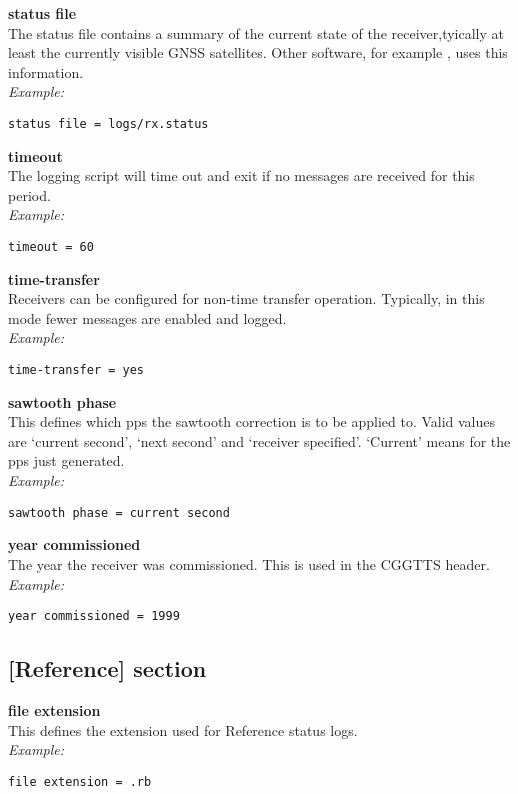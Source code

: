 {\bfseries status file}\\
The status file contains a summary of the current state of the receiver,tyically at least the
currently visible GNSS satellites. Other software, for example , uses this information.\\
\textit{Example:}
\begin{lstlisting}
status file = logs/rx.status
\end{lstlisting}

{\bfseries timeout}\\
The logging script will time out and exit if no messages are received for this period.\\
\textit{Example:}
\begin{lstlisting}
timeout = 60
\end{lstlisting}

{\bfseries time-transfer}\\
Receivers can be configured for non-time transfer operation. Typically, in this mode fewer
messages are enabled and logged.\\
\textit{Example:}
\begin{lstlisting}
time-transfer = yes
\end{lstlisting}

{\bfseries sawtooth phase}\\
This defines which pps the sawtooth correction is to be applied to.
Valid values are `current second', `next second' and `receiver specified'.
`Current' means for the pps just generated.\\
\textit{Example:}
\begin{lstlisting}
sawtooth phase = current second
\end{lstlisting}

{\bfseries year commissioned}\\
The year the receiver was commissioned. This is used in the CGGTTS header.\\
\textit{Example:}
\begin{lstlisting}
year commissioned = 1999
\end{lstlisting}

\subsection{[Reference] section}

\hypertarget{h:reference}{}

{\bfseries file extension}\\ \hypertarget{h:reference_file_extension}{}
This defines the extension used for Reference status logs.\\
\textit{Example:}
\begin{lstlisting}
file extension = .rb
\end{lstlisting}

